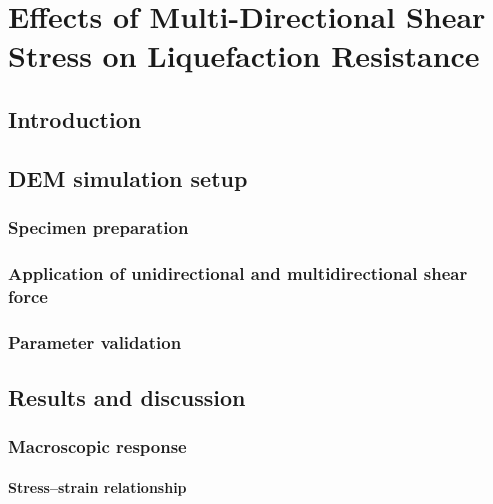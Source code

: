 \documentclass[../main]{subfiles}
\begin{document}
\chapter{Effects of Multi-Directional Shear Stress on Liquefaction Resistance}
\label{ch:multidirectional}

\section{Introduction}
\label{sec:ch5_intro}

\section{DEM simulation setup}
\label{sec:ch5_setup}

\subsection{Specimen preparation}
\label{subsec:ch5_specimen}

\subsection{Application of unidirectional and multidirectional shear force}
\label{subsec:ch5_loading}

\subsection{Parameter validation}
\label{subsec:ch5_validation}

\section{Results and discussion}
\label{sec:ch5_results}

\subsection{Macroscopic response}
\label{subsec:ch5_macro}

\subsubsection{Stress--strain relationship}
\end{document}
